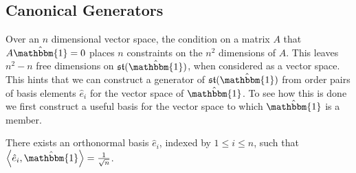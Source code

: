 \subsection{Canonical Generators}
Over an $n$ dimensional vector space, the condition on a matrix $A$ that $A \hat{\mathbbm{1}} = 0$
places $n$ constraints on the $n^2$ dimensions of $A$. This leaves $n^2 - n$ free dimensions
on $\mathfrak{st}(\hat{\mathbbm{1}})$, when considered as a vector space. This hints that we
can construct a generator of $\mathfrak{st}(\hat{\mathbbm{1}})$ from order pairs of basis
elements $\hat{e}_i$ for the vector space of $\hat{\mathbbm{1}}$. To see how this is done we
first construct a useful basis for the vector space to which $\hat{\mathbbm{1}}$ is a
member.
\begin{lemma}
	There exists an orthonormal basis $\hat{e}_i$, indexed by $1 \le i \le n$, such that $\left\langle \hat{e}_i, \hat{\mathbbm{1}} \right\rangle = \frac{1}{\sqrt{n}}$.
\end{lemma}
